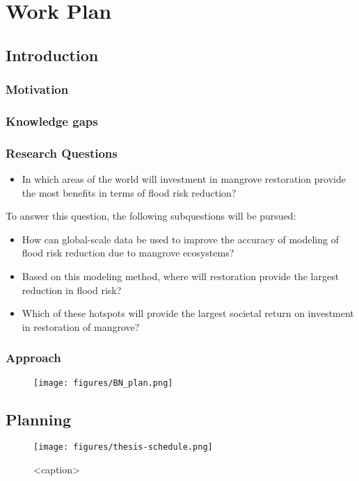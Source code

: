 \chapter{Work Plan}


\section{Introduction}
\subsection{Motivation}
\subsection{Knowledge gaps}
\subsection{Research Questions}

\begin{itemize}
  \item In which areas of the world will investment in mangrove restoration provide the most benefits in terms of flood risk reduction?
\end{itemize}
To answer this question, the following subquestions will be pursued:

\begin{itemize}
  \item How can global-scale data be used to improve the accuracy of modeling of flood risk reduction due to mangrove ecosystems?
  \item Based on this modeling method, where will restoration provide the largest reduction in flood risk?
  \item Which of these hotspots will provide the largest societal return on investment in restoration of mangrove?
\end{itemize}

\subsection{Approach}
\begin{figure}
  \centering
  \label{fig:approach}
  \texttt{[image: figures/BN\_plan.png]}
\end{figure}


\section{Planning}

\begin{figure}[htbp]
  \centering
  \texttt{[image: figures/thesis-schedule.png]}
  \caption{<caption>}
  \label{<label>}
\end{figure}